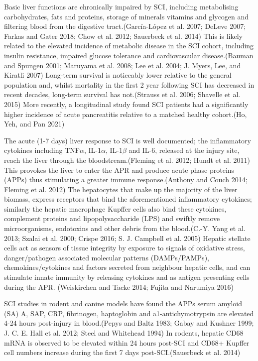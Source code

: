 \documentclass[9pt,lineno]{elife}
\begin{document}
\begin{landscape}
\begin{landscape}
Basic liver functions are chronically impaired by SCI, including metabolising carbohydrates, fats and proteins, storage of minerals vitamins and glycogen and filtering blood from the digestive tract.(García-López et al. 2007; DeLeve 2007; Farkas and Gater 2018; Chow et al. 2012; Sauerbeck et al. 2014) This is likely related to the elevated incidence of metabolic disease in the SCI cohort, including insulin resistance, impaired glucose tolerance and cardiovascular disease.(Bauman and Spungen 2001; Maruyama et al. 2008; Lee et al. 2004; J. Myers, Lee, and Kiratli 2007) Long-term survival is noticeably lower relative to the general population and, whilst mortality in the first 2 year following SCI has decreased in recent decades, long-term survival has not.(Strauss et al. 2006; Shavelle et al. 2015) More recently, a longitudinal study found SCI patients had a significantly higher incidence of acute pancreatitis relative to a matched healthy cohort.(Ho, Yeh, and Pan 2021)

The acute (1-7 days) liver response to SCI is well documented; the inflammatory cytokines including TNF\(\alpha\), IL-1\(\alpha\), IL-1\(\beta\) and IL-6, released at the injury site, reach the liver through the bloodstream.(Fleming et al. 2012; Hundt et al. 2011) This provokes the liver to enter the APR and produce acute phase proteins (APPs) thus stimulating a greater immune response.(Anthony and Couch 2014; Fleming et al. 2012) The hepatocytes that make up the majority of the liver biomass, express receptors that bind the aforementioned inflammatory cytokines; similarly the hepatic macrophage Kupffer cells also bind these cytokines, complement proteins and lipopolysaccharide (LPS) and swiftly remove microorganisms, endotoxins and other debris from the blood.(C.-Y. Yang et al. 2013; Szalai et al. 2000; Crispe 2016; S. J. Campbell et al. 2005) Hepatic stellate cells act as sensors of tissue integrity by exposure to signals of oxidative stress, danger/pathogen associated molecular patterns (DAMPs/PAMPs), chemokines/cytokines and factors secreted from neighbour hepatic cells, and can stimulate innate immunity by releasing cytokines and as antigen presenting cells during the APR. (Weiskirchen and Tacke 2014; Fujita and Narumiya 2016)

SCI studies in rodent and canine models have found the APPs serum amyloid (SA) A, SAP, CRP, fibrinogen, haptoglobin and a1-antichymotrypsin are elevated 4-24 hours post-injury in blood.(Pepys and Baltz 1983; Gabay and Kushner 1999; J. C. E. Hall et al. 2012; Steel and Whitehead 1994) In rodents, hepatic CD68 mRNA is observed to be elevated within 24 hours post-SCI and CD68+ Kupffer cell numbers increase during the first 7 days post-SCI.(Sauerbeck et al. 2014)


\end{landscape}
\end{landscape}
\end{document}
